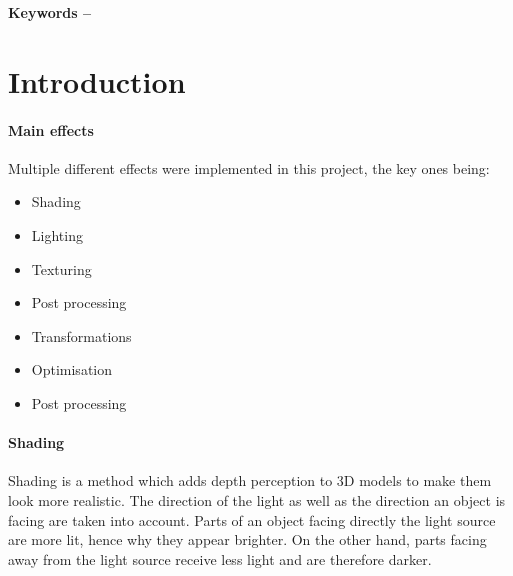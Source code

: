 \documentclass[10pt, a4paper]{article}
\title{\mytitle}
\author{\myauthor\hspace{1em}\\\contact\\Edinburgh Napier University\hspace{0.5em}-\hspace{0.5em}\mymodule}
\date{}
\newcommand{\figuremacro}[5]{
    \begin{figure}[#1]
        \centering
        \texttt{[image: \#2]}
        \caption[#3]{\textbf{#3}#4}
        \label{fig:#2}
    \end{figure}
}
\begin{document}
	\maketitle
	\begin{abstract}
    The aim of this project is to create a 3D scene in OpenGL, using key graphical rendering principles. A renderer framework was used in order to create effects and reduce development time. A number of graphical techniques were implemented such as lighting, texturing, cameras. The resulting scene is a moonlit eerie house, surrounded by dead trees. The inspiration for the project came from the cartoon Courage the Cowardly Dog \cite{courage}.
    \figuremacro{h}{courage.jpg}{Courage the Cowardly Dog}{ \textit{Inspiration for the project} }{1.0}
	\end{abstract}

    \textbf{Keywords -- }{\mykeywords}
    \section{Introduction}
    \paragraph{Main effects}
    Multiple different effects were implemented in this project, the key ones being:
    \begin{itemize}
        \item Shading
        \item Lighting
        \item Texturing
        \item Post processing
        \item Transformations
        \item Optimisation
        \item Post processing
    \end{itemize}
    \paragraph{Shading}
    Shading is a method which adds depth perception to 3D models to make them look more realistic. The direction of the light as well as the direction an object is facing are taken into account. Parts of an object facing directly the light source are more lit, hence why they appear brighter. On the other hand, parts facing away from the light source receive less light and are therefore darker.
\end{document}
